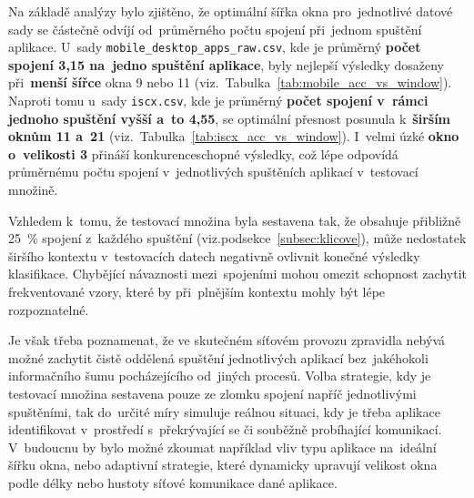 Na základě analýzy bylo zjištěno, že optimální šířka okna pro~jednotlivé datové sady se částečně odvíjí od~průměrného počtu spojení při~jednom spuštění aplikace. U~sady \texttt{mobile\_desktop\_apps\_raw.csv}, kde je průměrný \textbf{počet spojení 3{,}15 na~jedno spuštění aplikace}, byly nejlepší výsledky dosaženy při~\textbf{menší šířce} okna 9 nebo 11 (viz.~Tabulka~\ref{tab:mobile_acc_vs_window}). Naproti tomu u~sady \texttt{iscx.csv}, kde je průměrný \textbf{počet spojení v~rámci jednoho spuštění vyšší a~to 4{,}55}, se optimální přesnost posunula k~\textbf{širším oknům 11 a~21} (viz.~Tabulka~\ref{tab:iscx_acc_vs_window}). I~velmi úzké \textbf{okno o~velikosti 3} přináší konkurenceschopné výsledky, což lépe odpovídá průměrnému počtu spojení v~jednotlivých spuštěních aplikací v~testovací množině.

Vzhledem k~tomu, že testovací množina byla sestavena tak, že obsahuje přibližně 25~\% spojení z~každého spuštění (viz.podsekce~\ref{subsec:klicove}), může nedostatek širšího kontextu v~testovacích datech negativně ovlivnit konečné výsledky klasifikace. Chybějící návaznosti mezi~spojeními mohou omezit schopnost zachytit frekventované vzory, které by při~plnějším kontextu mohly být lépe rozpoznatelné.

Je však třeba poznamenat, že ve skutečném síťovém provozu zpravidla nebývá možné zachytit čistě oddělená spuštění jednotlivých aplikací bez~jakéhokoli informačního šumu pocházejícího od~jiných procesů. Volba strategie, kdy je testovací množina sestavena pouze ze zlomku spojení napříč jednotlivými spuštěními, tak do~určité míry simuluje reálnou situaci, kdy je třeba aplikace identifikovat v~prostředí s~překrývající se či souběžně probíhající komunikací. V~budoucnu by bylo možné zkoumat například vliv typu aplikace na~ideální šířku okna, nebo adaptivní strategie, které dynamicky upravují velikost okna podle délky nebo hustoty síťové komunikace dané aplikace.


